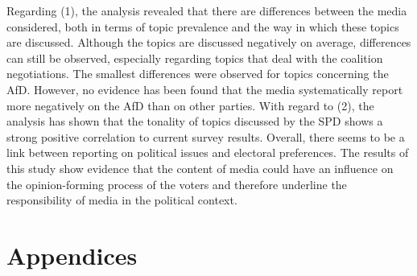 \documentclass[12pt,a4paper,notitlepage]{article}
\begin{document}
Regarding (1), the analysis revealed that there are differences between the media considered, both in terms of topic prevalence and the way in which these topics are discussed. Although the topics are discussed negatively on average, differences can still be observed, especially regarding topics that deal with the coalition negotiations. The smallest differences were observed for topics concerning the AfD. However, no evidence has been found that the media systematically report more negatively on the AfD than on other parties. With regard to (2), the analysis has shown that the tonality of topics discussed by the SPD shows a strong positive correlation to current survey results. Overall, there seems to be a link between reporting on political issues and electoral preferences. The results of this study show evidence that the content of media could have an influence on the opinion-forming process of the voters and therefore underline the responsibility of media in the political context.

\pagebreak

\printbibliography

\appendix
\section{Appendices}
\end{document}
